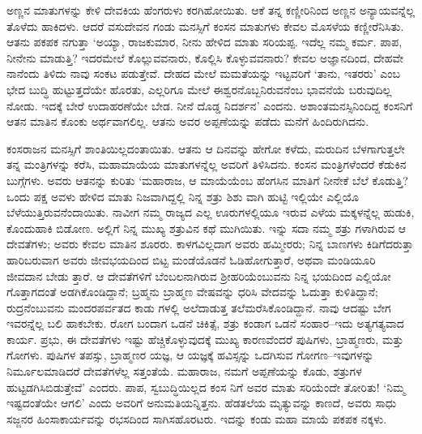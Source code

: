 ಅಣ್ಣನ ಮಾತುಗಳನ್ನು ಕೇಳಿ ದೇವಕಿಯ ಹೆಂಗರುಳು ಕರಗಿಹೋಯಿತು. ಆಕೆ ತನ್ನ ಕಣ್ಣೀರಿನಿಂದ ಅಣ್ಣನ ಅನ್ಯಾಯವನ್ನೆಲ್ಲ ತೊಳೆದು ಹಾಕಿದಳು. ಆದರೆ ವಸುದೇವನ ಗಂಡು ಮನಸ್ಸಿಗೆ ಕಂಸನ ಮಾತುಗಳು ಕೇವಲ ಮೊಸಳೆಯ ಕಣ್ಣೀರೆನಿಸಿತು. ಆತನು ಪಕಪಕ ನಗುತ್ತಾ ‘ಅಯ್ಯಾ, ರಾಜಕುಮಾರ, ನೀನು ಹೇಳಿದ ಮಾತು ಸರಿಯಪ್ಪ. ಇದೆಲ್ಲ ನಮ್ಮ ಕರ್ಮ. ಪಾಪ, ನೀನೇನು ಮಾಡುತ್ತಿ? ಇದರಮೇಲೆ ಕೊಲ್ಲುವವನಾರು, ಕೊಲ್ಲಿಸಿ ಕೊಳ್ಳುವವನಾರು? ಕೇವಲ ಅಜ್ಞಾನದಿಂದ, ದೇಹವೇ ನಾನೆಂದು ತಿಳಿದು ನಾವು ಸಂಕಟ ಪಡುತ್ತೇವೆ. ದೇಹದ ಮೇಲೆ ಮಮತೆಯನ್ನು ಇಟ್ಟವರಿಗೆ ‘ತಾನು, ಇತರರು’ ಎಂಬ ಭೇದ ಬುದ್ಧಿ ಹುಟ್ಟುತ್ತದೆಯೇ ಹೊರತು, ಎಲ್ಲರಿಗೂ ಮೇಲೆ ಈಶ್ವರನೊಬ್ಬನಿರುವನೆಂಬ ಭಾವನೆಯೆ ಬರುವುದಿಲ್ಲ ನೋಡು. ಇದಕ್ಕೆ ಬೇರೆ ಉದಾಹರಣೆಯೇ ಬೇಡ. ನೀನೆ ದೊಡ್ಡ ನಿದರ್ಶನ’ ಎಂದನು. ಅಶಾಂತಮನಸ್ಸಿನಿಂದಿದ್ದ ಕಂಸನಿಗೆ ಆತನ ಮಾತಿನ ಕೊಂಕು ಅರ್ಥವಾಗಲಿಲ್ಲ. ಆತನು ಅವರ ಅಪ್ಪಣೆಯನ್ನು ಪಡೆದು ಮನೆಗೆ ಹಿಂದಿರುಗಿದನು.

ಕಂಸರಾಜನ ಮನಸ್ಸಿಗೆ ಶಾಂತಿಯಿಲ್ಲದಂತಾಯಿತು. ಆತನು ಆ ದಿನವನ್ನು ಹೇಗೋ ಕಳೆದು, ಮರುದಿನ ಬೆಳಗಾಗುತ್ತಲೇ ತನ್ನ ಮಂತ್ರಿಗಳನ್ನು ಕರೆಸಿ, ಮಹಾಮಾಯೆಯ ಮಾತುಗಳನ್ನೆಲ್ಲ ಅವರಿಗೆ ತಿಳಿಸಿದನು. ಕಂಸನ ಮಂತ್ರಿಗಳೆಂದರೆ ಕೆಡುಕಿನ ಬುಗ್ಗೆಗಳು. ಅವರು ಆತನನ್ನು ಕುರಿತು ‘ಮಹಾರಾಜ, ಆ ಮಾಯೆಯೆಂಬ ಹೆಂಗಸಿನ ಮಾತಿಗೆ ನೀನೇಕೆ ಬೆಲೆ ಕೊಡುತ್ತಿ? ಒಂದು ಪಕ್ಷ ಅವಳು ಹೇಳಿದ ಮಾತು ನಿಜವಾಗಿದ್ದಲ್ಲಿ ನಿನ್ನ ಶತ್ರು ಶಿಶು ವಾಗಿ ಹುಟ್ಟಿ ಇಲ್ಲಿಯೇ ಎಲ್ಲಿಯೊ ಬೆಳೆಯುತ್ತಿರುವನೆಂದಾಯಿತು. ನಾವೀಗ ನಮ್ಮ ರಾಜ್ಯದ ಎಲ್ಲ ಊರುಗಳಲ್ಲಿಯೂ ಇರುವ ಎಳೆಯ ಮಕ್ಕಳನ್ನೆಲ್ಲ ಹುಡುಕಿ, ಕೊಂದುಹಾಕಿ ಬಿಡೋಣ. ಅಲ್ಲಿಗೆ ನಿನ್ನ ಮುಖ್ಯ ಶತ್ರುವಿನ ಕಥೆ ಮುಗಿಯಿತು. ಇನ್ನು ಸದಾ ನಮ್ಮ ಶತ್ರು ಗಳಾಗಿರುವ ಆ ದೇವತೆಗಳು; ಅವರು ಕೇವಲ ಮಾತಿನ ಶೂರರು. ಕಾಳಗವಿಲ್ಲದಾಗ ಅವರು ಹಮ್ಮೀರರು; ನಿನ್ನ ಬಾಣಗಳು ಕಿಡಿಗೆದರುತ್ತಾ ಹಾರಿಬರುವಾಗ ಅವರು ಜೀವಭಯದಿಂದ ಬಿಟ್ಟ ಮಂಡೆಯೊಡನೆ ಓಡಿಹೋಗುತ್ತಾರೆ, ಅಥವಾ ಮಂಡಿಯೂರಿ ಜೀವದಾನ ಬೇಡು ತ್ತಾರೆ. ಆ ದೇವತೆಗಳಿಗೆ ಬೆಂಬಲನಾಗಿರುವ ಶ್ರೀಹರಿಯೆಂಬುವನು ನಿನ್ನ ಭಯದಿಂದ ಎಲ್ಲಿಯೋ ಗೊತ್ತಾಗದಂತೆ ಅಡಗಿಕೊಂಡಿದ್ದಾನೆ; ಬ್ರಹ್ಮನು ಬ್ರಾಹ್ಮಣ ವೇಷವನ್ನು ಧರಿಸಿ ವೇದವನ್ನು ಓದುತ್ತಾ ಕುಳಿತಿದ್ದಾನೆ; ರುದ್ರನೆಂಬುವನು ಮಂದರಪರ್ವತದ ಕಾಡು ಗಳಲ್ಲಿ ಅಲೆದಾಡುತ್ತ ತಲೆಮರೆಸಿಕೊಂಡಿದ್ದಾನೆ. ನಾವು ಆದಷ್ಟು ಬೇಗ ಇವರನ್ನೆಲ್ಲ ಬಲಿ ಹಾಕಬೇಕು. ರೋಗ ಬಂದಾಗ ಒಡನೆ ಚಿಕಿತ್ಸೆ, ಶತ್ರು ಕಂಡಾಗ ಒಡನೆ ಸಂಹಾರ–ಇದು ಅತ್ಯಗತ್ಯವಾದ ಕಾರ್ಯ. ಪ್ರಭು, ಈ ದೇವತೆಗಳು ಇಷ್ಟು ಹೆಚ್ಚಿಕೊಳ್ಳುವುದಕ್ಕೆ ಮುಖ್ಯ ಕಾರಣವೆಂದರೆ ಪುಷಿಗಳು, ಬ್ರಾಹ್ಮಣರು, ಮತ್ತು ಗೋಗಳು. ಪುಷಿಗಳ ತಪಸ್ಸು, ಬ್ರಾಹ್ಮಣರ ಯಜ್ಞ, ಆ ಯಜ್ಞಕ್ಕೆ ಹವಿಸ್ಸನ್ನು ಒದಗಿಸುವ ಗೋಗಣ–ಇವುಗಳನ್ನು ನಿರ್ಮೂಲಮಾಡಿದರೆ ದೇವತೆಗಳೆಲ್ಲ ಸತ್ತಂತೆಯೆ. ಮಹಾರಾಜ, ನಮಗೆ ಅಪ್ಪಣೆಯನ್ನು ಕೊಡು, ಶತ್ರುಗಳ ಹುಟ್ಟಡಗಿಸಿಬಿಡುತ್ತೇವೆ’ ಎಂದರು. ಪಾಪ, ಸ್ವಬುದ್ಧಿಯಿಲ್ಲದ ಕಂಸ ನಿಗೆ ಅವರ ಮಾತು ಸರಿಯೆಂದೇ ತೋರಿತು! ‘ನಿಮ್ಮ ಇಷ್ಟದಂತೆಯೇ ಆಗಲಿ’ ಎಂದು ಅವರಿಗೆ ಅನುಮತಿಯನ್ನಿತ್ತನು. ಹೆಡತಲೆಯ ಮೃತ್ಯುವನ್ನು ಕಾಣದೆ, ಅವರು ಸಾಧು ಸಜ್ಜನರ ಹಿಂಸಾಕಾರ್ಯವನ್ನು ರಭಸದಿಂದ ಸಾಗಿಸಹೊರಟರು. ಇದನ್ನು ಕಂಡು ಮಹಾ ಮಾಯೆ ಪಕಪಕ ನಕ್ಕಳು.

